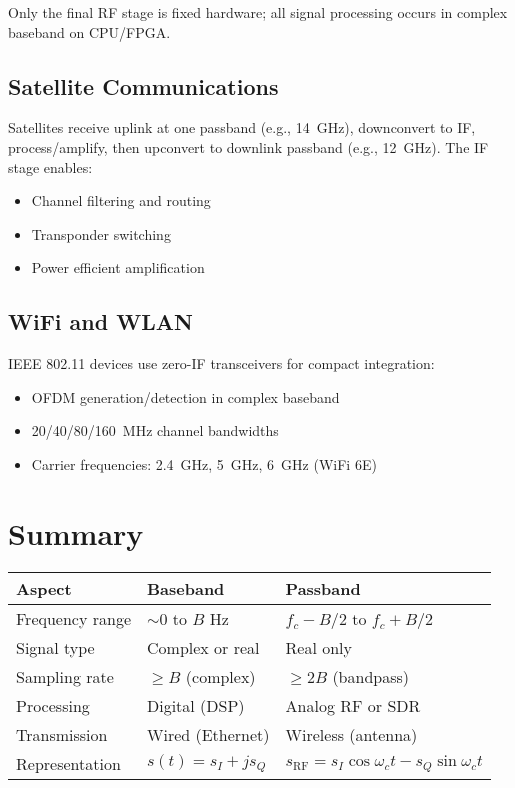 Only the final RF stage is fixed hardware; all signal processing occurs in complex baseband on CPU/FPGA.

\subsection{Satellite Communications}

Satellites receive uplink at one passband (e.g., 14~GHz), downconvert to IF, process/amplify, then upconvert to downlink passband (e.g., 12~GHz). The IF stage enables:
\begin{itemize}
\item Channel filtering and routing
\item Transponder switching
\item Power efficient amplification
\end{itemize}

\subsection{WiFi and WLAN}

IEEE 802.11 devices use zero-IF transceivers for compact integration:
\begin{itemize}
\item OFDM generation/detection in complex baseband
\item 20/40/80/160~MHz channel bandwidths
\item Carrier frequencies: 2.4~GHz, 5~GHz, 6~GHz (WiFi 6E)
\end{itemize}

\section{Summary}

\begin{center}
\begin{tabular}{@{}lp{5cm}p{6cm}@{}}
\toprule
\textbf{Aspect} & \textbf{Baseband} & \textbf{Passband} \\
\midrule
Frequency range & $\sim 0$ to $B$ Hz & $f_c - B/2$ to $f_c + B/2$ \\
Signal type & Complex or real & Real only \\
Sampling rate & $\geq B$ (complex) & $\geq 2B$ (bandpass) \\
Processing & Digital (DSP) & Analog RF or SDR \\
Transmission & Wired (Ethernet) & Wireless (antenna) \\
Representation & $s(t) = s_I + js_Q$ & $s_{\text{RF}} = s_I\cos\omega_c t - s_Q\sin\omega_c t$ \\
\bottomrule
\end{tabular}
\end{center}

